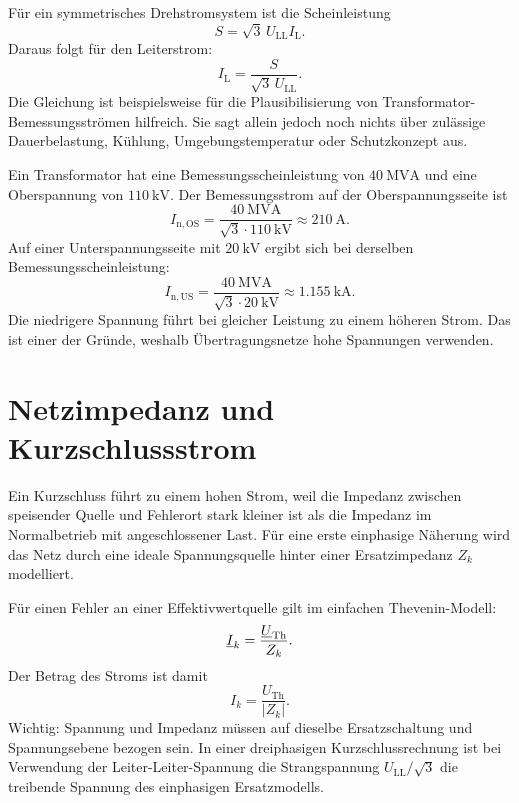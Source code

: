 Für ein symmetrisches Drehstromsystem ist die Scheinleistung
\begin{equation}
  S=\sqrt{3}\,U_\mathrm{LL} I_\mathrm{L}.
  \label{eq:netz_scheinleistung}
\end{equation}
Daraus folgt für den Leiterstrom:
\begin{equation}
  I_\mathrm{L}=\frac{S}{\sqrt{3}\,U_\mathrm{LL}}.
  \label{eq:netz_nennstrom}
\end{equation}
Die Gleichung ist beispielsweise für die Plausibilisierung von
Transformator-Bemessungsströmen hilfreich. Sie sagt allein jedoch noch nichts
über zulässige Dauerbelastung, Kühlung, Umgebungstemperatur oder Schutzkonzept
aus.

\begin{rechenbeispiel}
Ein Transformator hat eine Bemessungsscheinleistung von
\(\SI{40}{\mega\volt\ampere}\) und eine Oberspannung von
\(\SI{110}{\kilo\volt}\). Der Bemessungsstrom auf der Oberspannungsseite ist
\[
I_\mathrm{n,OS}=
\frac{\SI{40}{\mega\volt\ampere}}
{\sqrt{3}\cdot\SI{110}{\kilo\volt}}
\approx \SI{210}{\ampere}.
\]
Auf einer Unterspannungsseite mit \(\SI{20}{\kilo\volt}\) ergibt sich bei
derselben Bemessungsscheinleistung:
\[
I_\mathrm{n,US}=
\frac{\SI{40}{\mega\volt\ampere}}
{\sqrt{3}\cdot\SI{20}{\kilo\volt}}
\approx \SI{1.155}{\kilo\ampere}.
\]
Die niedrigere Spannung führt bei gleicher Leistung zu einem höheren Strom.
Das ist einer der Gründe, weshalb Übertragungsnetze hohe Spannungen verwenden.
\end{rechenbeispiel}

\section{Netzimpedanz und Kurzschlussstrom}

Ein Kurzschluss führt zu einem hohen Strom, weil die Impedanz zwischen
speisender Quelle und Fehlerort stark kleiner ist als die Impedanz im
Normalbetrieb mit angeschlossener Last. Für eine erste einphasige Näherung
wird das Netz durch eine ideale Spannungsquelle hinter einer Ersatzimpedanz
\(Z_k\) modelliert.

Für einen Fehler an einer Effektivwertquelle gilt im einfachen Thevenin-Modell:
\begin{equation}
  \underline{I}_k=\frac{\underline{U}_\mathrm{Th}}{Z_k}.
  \label{eq:thevenin_ik}
\end{equation}
Der Betrag des Stroms ist damit
\[
I_k=\frac{U_\mathrm{Th}}{|Z_k|}.
\]
Wichtig: Spannung und Impedanz müssen auf dieselbe Ersatzschaltung und
Spannungsebene bezogen sein. In einer dreiphasigen Kurzschlussrechnung ist
bei Verwendung der Leiter-Leiter-Spannung die Strangspannung
\(U_\mathrm{LL}/\sqrt{3}\) die treibende Spannung des einphasigen
Ersatzmodells.

